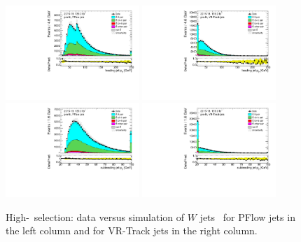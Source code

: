 \begin{figure}[bth]
	\centering
	\includegraphics[width=0.45\textwidth]{FTAG_plots/pretagNoRwnewonlyPFlowall/DataMC_h_J0_pt.pdf}
	\includegraphics[width=0.45\textwidth]{FTAG_plots/pretagNoRwnewonlyVRJetsall/DataMC_h_J0_pttrackjet.pdf}\\
	\includegraphics[width=0.45\textwidth]{FTAG_plots/pretagNoRwnewonlyPFlowall/DataMC_h_J1_pt.pdf}
	\includegraphics[width=0.45\textwidth]{FTAG_plots/pretagNoRwnewonlyVRJetsall/DataMC_h_J1_pttrackjet.pdf}\\
	\caption{High-\pt\ selection: data versus simulation of $W$ jets \pt\ for 
	PFlow jets in the left column and for VR-Track jets in the right column.}
	\label{fig:kinematic_distributions_highpT}
\end{figure}
	

